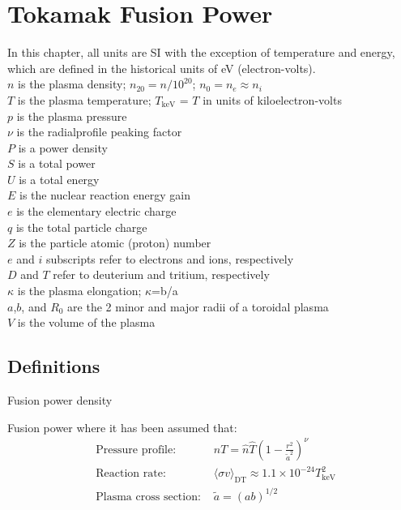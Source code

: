 \chapter{Tokamak Fusion Power}
In this chapter, all units are SI with the exception of temperature
and energy, which are defined in the historical units of eV
(electron-volts).\\

\noindent
$n$ is the plasma density; $n_{20}=n/10^{20}$; $n_0 = n_e \approx n_i$\\
$T$ is the plasma temperature; $T_\mathrm{keV}$ = $T$ in units of kiloelectron-volts\\
$p$ is the plasma pressure\\
$\nu$ is the radialprofile peaking factor\\
$P$ is a power density\\
$S$ is a total power\\
$U$ is a total energy\\
$E$ is the nuclear reaction energy gain\\
$e$ is the elementary electric charge\\
$q$ is the total particle charge\\
$Z$ is the particle atomic (proton) number\\
$e$ and $i$ subscripts refer to electrons and ions, respectively\\
$D$ and $T$ refer to deuterium and tritium, respectively\\
$\kappa$ is the plasma elongation; $\kappa$=b/a\\
$a$,$b$, and $R_0$ are the 2 minor and major radii of a toroidal plasma\\
$V$ is the volume of the plasma\\

\section{Definitions}
\noindent
Fusion power density 

\noindent
Fusion power 
\indent
where it has been assumed that:
\begin{eqnarray*}
  &\text{Pressure profile: }& nT = \hat{n}\hat{T}\left(1-\frac{r^2}{\tilde{a}^2}\right)^\nu \\
  &\text{Reaction rate: }& \langle\sigma v\rangle_\mathrm{DT} \approx 1.1\times10^{-24}T_\mathrm{keV}^2 \\
  &\text{Plasma cross section: }& \tilde{a} = (ab)^{1/2}
\end{eqnarray*}

